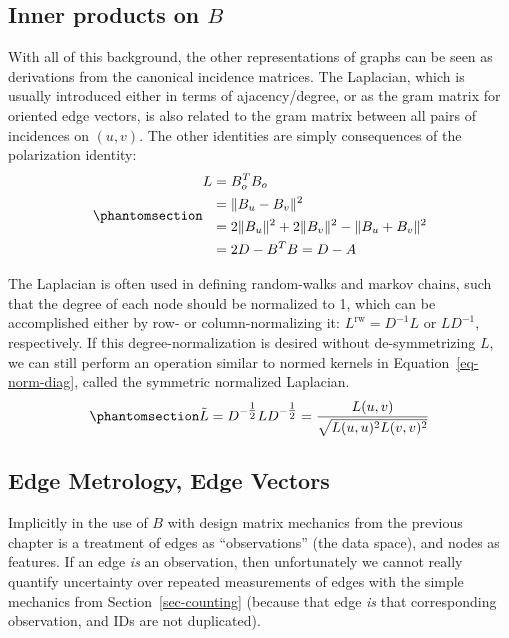\documentclass[%
	12pt,
		oneside,
		letterpaper
]{book}
\begin{document}
\subsection{\texorpdfstring{Inner products on
\(B\)}{Inner products on B}}\label{inner-products-on-b}

With all of this background, the other representations of graphs can be
seen as derivations from the canonical incidence matrices. The
Laplacian, which is usually introduced either in terms of
ajacency/degree, or as the gram matrix for oriented edge vectors, is
also related to the gram matrix between all pairs of incidences on
\((u,v)\). The other identities are simply consequences of the
polarization identity:
\begin{equation}\phantomsection\label{eq-laplacian}{
\begin{split}
L & = B_o^TB_o\\
  & = \|B_u - B_v \|^2 \\
  & = 2\|B_u\|^2 +2\|B_v\|^2 - \|B_u + B_v \|^2 \\
  & = 2D - B^TB = D-A
\end{split}
}\end{equation}

The Laplacian is often used in defining random-walks and markov chains,
such that the degree of each node should be normalized to 1, which can
be accomplished either by row- or column-normalizing it:
\(L^{\textrm{rw}}=D^{-1}L\) or \(LD^{-1}\), respectively. If this
degree-normalization is desired without de-symmetrizing \(L\), we can
still perform an operation similar to normed kernels in
Equation~\ref{eq-norm-diag}, called the symmetric normalized Laplacian.
\begin{equation}\phantomsection\label{eq-norm-laplacian}{
\tilde{L} = D^{-\tfrac{1}{2}}LD^{-\tfrac{1}{2}} = \frac{L(u,v)}{\sqrt{L(u,u)^2L(v,v)^2}}
}\end{equation}

\subsection{Edge Metrology, Edge
Vectors}\label{edge-metrology-edge-vectors}

Implicitly in the use of \(B\) with design matrix mechanics from the
previous chapter is a treatment of edges as ``observations'' (the data
space), and nodes as features. If an edge \emph{is} an observation, then
unfortunately we cannot really quantify uncertainty over repeated
measurements of edges with the simple mechanics from
Section~\ref{sec-counting} (because that edge \emph{is} that
corresponding observation, and IDs are not duplicated).
\end{document}

